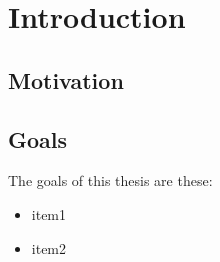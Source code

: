 \chapter{Introduction}

\section{Motivation}


\section{Goals}


The goals of this thesis are these:

\begin{itemize}
  \item item1
  \item item2
\end{itemize}